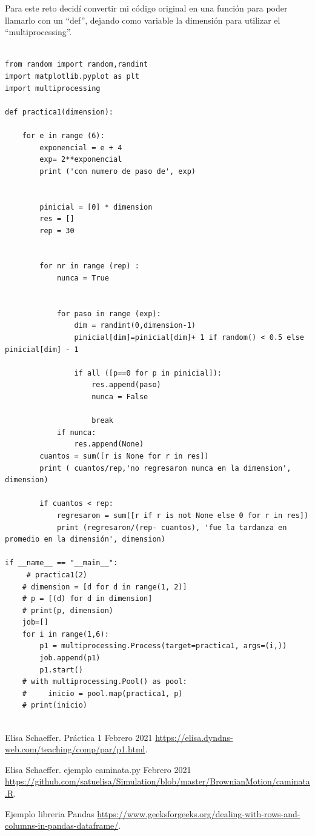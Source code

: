 \documentclass{article}
\begin{document}
Para este reto decidí convertir mi código original en una función para poder llamarlo con un “def”, dejando como variable la dimensión para utilizar el “multiprocessing”.

\begin{verbatim}

from random import random,randint
import matplotlib.pyplot as plt
import multiprocessing

def practica1(dimension):

    for e in range (6):
        exponencial = e + 4
        exp= 2**exponencial
        print ('con numero de paso de', exp)
     
        
        pinicial = [0] * dimension
        res = []
        rep = 30
        
        
        for nr in range (rep) :
            nunca = True 
            
            
            for paso in range (exp):
                dim = randint(0,dimension-1)
                pinicial[dim]=pinicial[dim]+ 1 if random() < 0.5 else pinicial[dim] - 1
                
                if all ([p==0 for p in pinicial]):
                    res.append(paso)
                    nunca = False
                    
                    break
            if nunca:
                res.append(None)
        cuantos = sum([r is None for r in res])
        print ( cuantos/rep,'no regresaron nunca en la dimension', dimension)
        
        if cuantos < rep:
            regresaron = sum([r if r is not None else 0 for r in res])
            print (regresaron/(rep- cuantos), 'fue la tardanza en promedio en la dimensión', dimension)
            
if __name__ == "__main__":
     # practica1(2)
    # dimension = [d for d in range(1, 2)]
    # p = [(d) for d in dimension]
    # print(p, dimension)
    job=[]
    for i in range(1,6):
        p1 = multiprocessing.Process(target=practica1, args=(i,))
        job.append(p1)
        p1.start()
    # with multiprocessing.Pool() as pool:
    #     inicio = pool.map(practica1, p)
    # print(inicio)
   
\end{verbatim}

\begin{thebibliography}{99} %

 Elisa Schaeffer. Práctica 1 Febrero 2021
\url{https://elisa.dyndns-web.com/teaching/comp/par/p1.html}.

 Elisa Schaeffer. ejemplo caminata.py Febrero 2021
\url{https://github.com/satuelisa/Simulation/blob/master/BrownianMotion/caminata.R}.

 Ejemplo libreria Pandas
\url{https://www.geeksforgeeks.org/dealing-with-rows-and-columns-in-pandas-dataframe/}.

\end{thebibliography}
\end{document}
